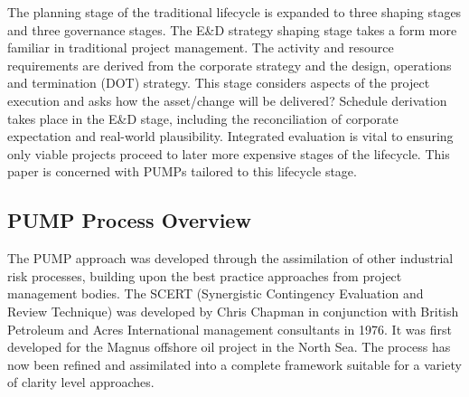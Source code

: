 The planning stage of the traditional lifecycle is expanded to three shaping stages and three governance stages.
The E\&D strategy shaping stage takes a form more familiar in traditional project management.
The activity and resource requirements are derived from the corporate strategy and the design, operations and termination (DOT) strategy. %
This stage considers aspects of the project execution and asks how the asset/change will be delivered?
Schedule derivation takes place in the E\&D stage, including the reconciliation of corporate expectation and real-world plausibility.
Integrated evaluation is vital to ensuring only viable projects proceed to later more expensive stages of the lifecycle.
This paper is concerned with PUMPs tailored to this lifecycle stage.



\subsection{PUMP Process Overview}

The PUMP approach was developed through the assimilation of other industrial risk processes, building upon the best practice approaches from project management bodies.
The SCERT (Synergistic Contingency Evaluation and Review Technique) was developed by Chris Chapman in conjunction with British Petroleum and Acres International management consultants in 1976.
It was first developed for the Magnus offshore oil project in the North Sea. 
The process has now been refined and assimilated into a complete framework suitable for a variety of clarity level approaches.

